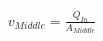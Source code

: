 \documentclass[preview]{standalone}
\begin{document}
\begin{align*}
v_{Middle} = \frac{\dot{Q}_{In}}{A_{Middle}}
\end{align*}
\end{document}
